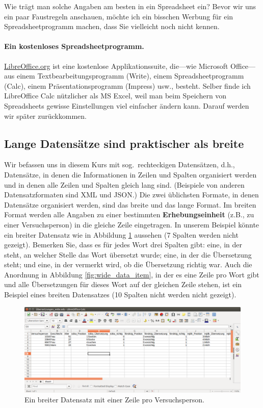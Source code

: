 \documentclass[oneside, 10pt]{book}\usepackage[]{graphicx}\usepackage[]{xcolor}
\begin{document}
Wie trägt man solche Angaben am besten in ein Spreadsheet ein?
Bevor wir uns ein paar Faustregeln anschauen, möchte ich ein bisschen
Werbung für ein Spreadsheetprogramm machen, dass Sie vielleicht noch
nicht kennen.

\paragraph{Ein kostenloses Spread\-sheetprogramm.}
\href{http://libreoffice.org}{LibreOffice.org} ist eine
kostenlose Applikationssuite, die---wie Microsoft Office---aus 
einem Textbearbeitungsprogramm (Write), einem Spread\-sheetprogramm
(Calc), einem Präsentationsprogramm (Impress) usw., besteht.
Selber finde ich LibreOffice Calc nützlicher als MS Excel,
weil man beim Speichern von Spread\-sheets gewisse Einstellungen
viel einfacher ändern kann. Darauf werden wir später zurückkommen.

\subsection{Lange Datensätze sind praktischer als breite}
Wir befassen uns in diesem Kurs mit sog.\ rechteckigen Datensätzen,
d.h., Datensätze, in denen die Informationen in Zeilen und Spalten
organisiert werden und in denen alle Zeilen und Spalten gleich lang sind.
(Beispiele von anderen Datensatzformaten sind XML und JSON.)
Die zwei üblichsten Formate, in denen Datensätze organisiert werden,
sind das breite und das lange Format.
Im breiten Format werden alle Angaben zu einer bestimmten
\textbf{Erhebungseinheit} (z.B., zu einer Versuchsperson) in die gleiche
Zeile eingetragen. In unserem Beispiel könnte ein breiter Datensatz
wie in Abbildung \ref{fig:wide_data_subject} aussehen (7 Spalten werden nicht gezeigt).
Bemerken Sie, dass es für jedes Wort drei Spalten gibt:
eine, in der steht, an welcher Stelle das Wort übersetzt wurde;
eine, in der die Übersetzung steht;
und eine, in der vermerkt wird, ob die Übersetzung richtig war.
Auch die Anordnung in Abbildung \ref{fig:wide_data_item}, in der es eine Zeile pro Wort gibt
und alle Übersetzungen für dieses Wort auf der gleichen Zeile
stehen, ist ein Beispiel eines breiten Datensatzes (10 Spalten nicht
werden nicht gezeigt).

\begin{figure}[tp]
\includegraphics[width = \textwidth]{figs/wide_data_subject.png}
\caption{Ein breiter Datensatz mit einer Zeile pro Versuchsperson.}
\label{fig:wide_data_subject}
\end{figure}
\end{document}
